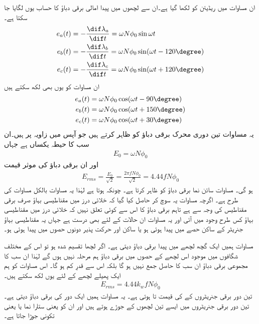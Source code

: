 ان مساوات میں  ریڈیئن کو  لکھا گیا ہے۔ان سے لچھوں میں پیدا امالی برقی دباؤ کا حساب یوں لگایا جا سکتا ہے۔
\begin{gather}
\begin{aligned}
e_a(t)&=-\frac{\dif \lambda_a}{\dif t}=\omega N \phi_0 \sin \omega t\\
e_b(t)&=-\frac{\dif \lambda_b}{\dif t}=\omega N \phi_0 \sin (\omega t-120\degree)\\
e_c(t)&=-\frac{\dif \lambda_c}{\dif t}=\omega N \phi_0 \sin (\omega t+120\degree)
\end{aligned}
\end{gather}
ان مساوات کو یوں بھی لکھ سکتے ہیں
\begin{gather}
\begin{aligned}
e_a(t)&=\omega N \phi_0 \cos (\omega t -90\degree)\\
e_b(t)&=\omega N \phi_0 \cos (\omega t+150\degree)\\
e_c(t)&=\omega N \phi_0 \cos (\omega t+30\degree)
\end{aligned}
\end{gather}
یہ مساوات تین دوری محرک برقی دباؤ  کو ظاہر کرتے ہیں جو آپس میں  زاویہ پر ہیں۔ان سب کا حیطہ  یکساں ہے جہاں
\begin{align}
E_0=\omega N \phi_0
\end{align}
اور ان برقی دباؤ کی موثر قیمت
\begin{align}
E_{rms}=\frac{E_0}{\sqrt{2}}=\frac{2\pi f N \phi_0}{\sqrt{2}}=4.44 f N \phi_0
\end{align}
ہو گی۔ مساوات  سائن نما برقی دباؤ کو ظاہر کرتا ہے۔ چونکہ ہوتا ہے  لہٰذا یہ مساوات بالکل مساوات  کی طرح ہے۔ اگرچہ مساوات  یہ سوچ کر حاصل کیا گیا کہ خلائی درز میں مقناطیسی بہاؤ صرف برقی مقناطیس کی وجہ سے ہے تاہم برقی دباؤ کا اس سے کوئی تعلق نہیں کہ خلائی درز میں مقناطیسی بہاؤ کس طرح وجود میں آئی اور یہ مساوات ان حالات کے لئے بھی درست ہے جہاں یہ مقناطیسی بہاؤ جنریٹر کے ساکن حصے میں پیدا ہوئی ہو یا ساکن اور حرکت پذیر دونوں حصوں میں پیدا ہوئی ہو۔

مساوات  ہمیں ایک گچھ لچھے میں پیدا برقی دباؤ دیتی ہے۔ اگر لچھا تقسیم شدہ ہو تو اس کے مختلف شگافوں میں موجود اس لچھے کے حصوں میں برقی دباؤ ہم مرحلہ نہیں ہوں گے لہٰذا ان سب کا مجموعی برقی دباؤ ان سب کا حاصل جمع نہیں ہو گا بلکہ اس سے قدرِ کم ہو گا۔ اس مساوات کو ہم ایک پھیلے لچھے کے لئے یوں لکھ سکتے ہیں۔
\begin{align}
E_{rms}=4.44 k_w f N \phi_0
\end{align}
تین دور برقی جنریٹروں کے  کی قیمت  تا  ہوتی ہے۔ یہ مساوات ہمیں ایک دور کی برقی دباؤ دیتی ہے۔ تین دور برقی جنریٹروں میں ایسے تین لچھوں کے جوڑے ہوتے ہیں اور ان کو  یعنی ستارا نما یا  یعنی تکونی جوڑا جاتا ہے۔

